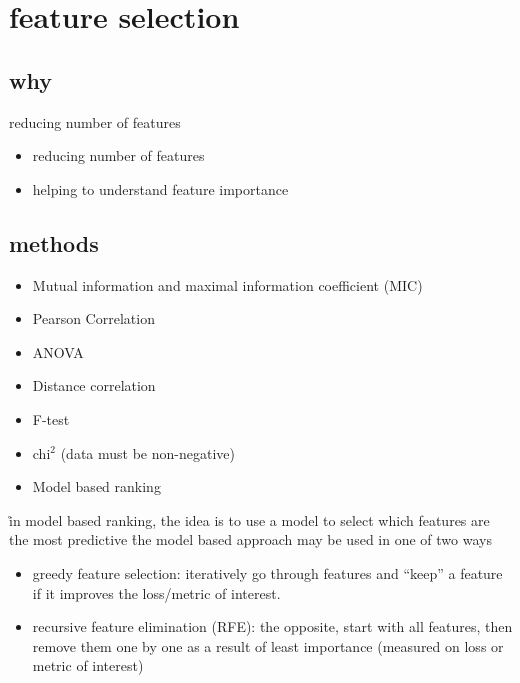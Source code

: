 \section{feature selection}


\subsection{why}

reducing number of features
\begin{itemize}[noitemsep,topsep=0pt]
	\item reducing number of features
	\item helping to understand feature importance
\end{itemize}

\subsection{methods}





\begin{itemize}[noitemsep,topsep=0pt]
	\item Mutual information and maximal information coefficient (MIC)
	\item Pearson Correlation
	\item ANOVA
	\item Distance correlation
	\item F-test
	\item chi$^2$ (data must be non-negative)
	\item Model based ranking
\end{itemize}

\r{in model based ranking, the idea is to use a model to select which features are the most predictive}
\r{the model based approach may be used in one of two ways}
\begin{itemize}[noitemsep,topsep=0pt]
	\item greedy feature selection: iteratively go through features and ``keep'' a feature if it improves the loss/metric of interest. 
	\item recursive feature elimination (RFE): the opposite, start with all features, then remove them one by one as a result of least importance (measured on loss or metric of interest)
\end{itemize}




